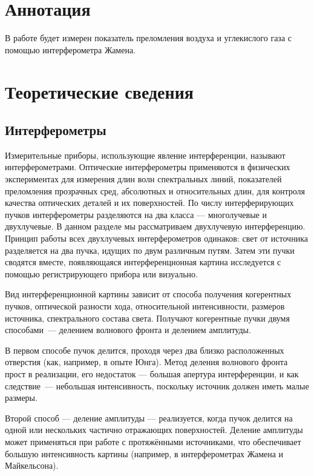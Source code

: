 \documentclass[a4paper, 12pt]{article}
\begin{document}

\section{Аннотация}
В работе будет измерен показатель преломления воздуха и углекислого
газа с помощью интерферометра Жамена.





\section{Теоретические сведения}
\subsection*{Интерферометры}
Измерительные приборы, использующие явление интерференции, называют
интерферометрами. Оптические интерферометры применяются в физических
экспериментах для измерения длин волн спектральных линий, показателей
преломления прозрачных сред, абсолютных и относительных длин, для
контроля качества оптических деталей и их поверхностей. По числу
интерферирующих пучков интерферометры разделяются на два класса —
многолучевые и двухлучевые. В данном разделе мы рассматриваем
двухлучевую интерференцию. Принцип работы всех двухлучевых
интерферометров одинаков: свет от источника разделяется на два пучка,
идущих по двум различным путям. Затем эти пучки сводятся вместе,
появляющаяся интерференционная картина исследуется с помощью
регистрирующего прибора или визуально.

Вид интерференционной картины зависит от способа получения когерентных
пучков, оптической разности хода, относительной интенсивности,
размеров источника, спектрального состава света. Получают когерентные
пучки двумя способами~--- делением волнового фронта и делением
амплитуды.

В первом способе пучок делится, проходя через два близко расположенных
отверстия (как, например, в опыте Юнга). Метод деления волнового
фронта прост в реализации, его недостаток — большая апертура
интерференции, и как следствие~--- небольшая интенсивность, поскольку
источник должен иметь малые размеры.

Второй способ — деление амплитуды — реализуется, когда пучок делится
на одной или нескольких частично отражающих поверхностей. Деление
амплитуды может применяться при работе с протяжёнными источниками, что
обеспечивает большую интенсивность картины (например, в
интерферометрах Жамена и Майкельсона).
\end{document}
